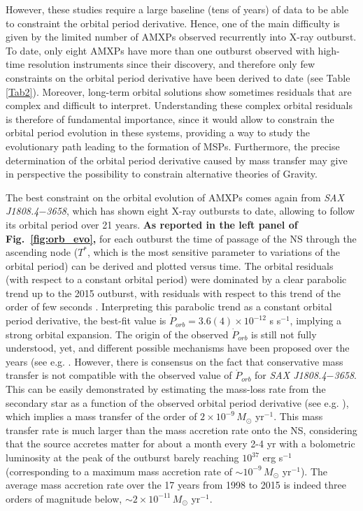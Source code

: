 \documentclass[graybox]{svmult}
\def \saxj{{\em SAX J1808.4$-$3658\xspace}}
\begin{document}
However, these studies require a large baseline (tens of years) of data to be able to constraint the orbital period derivative. Hence, one of the main difficulty is given by the limited number of AMXPs observed recurrently into X-ray outburst. To date, only eight AMXPs have more than one outburst observed with high-time resolution instruments since their discovery, and therefore only few constraints on the orbital period derivative have been derived to date (see Table \ref{Tab2}). Moreover, long-term orbital solutions show sometimes residuals that are complex and difficult to interpret. Understanding these complex orbital residuals is therefore of fundamental importance, since it would allow to constrain the orbital period evolution in these systems, providing a way to study the evolutionary path leading to the formation of MSPs. Furthermore, the precise determination of the orbital period derivative caused by mass transfer may give in perspective the possibility to constrain alternative theories of Gravity.

The best constraint on the orbital evolution of AMXPs comes again from \saxj{}, which has shown eight X-ray outbursts to date, allowing to follow its orbital period over 21 years. \textbf{As reported in the left panel of Fig.~\ref{fig:orb_evo},} for each outburst the time of passage of the NS through the ascending node ($T^*$, which is the most sensitive parameter to variations of the orbital period) can be derived and plotted versus time. The orbital residuals (with respect to a constant orbital period) were dominated by a clear parabolic trend up to the 2015 outburst, with residuals with respect to this trend of the order of few seconds \cite{Sanna2017c}. Interpreting this parabolic trend as a constant orbital period derivative, the best-fit value is $\dot P_{orb} = 3.6(4) \times 10^{-12}$ s s$^{-1}$, implying a strong orbital expansion. The origin of the observed $\dot P_{orb}$ is still not fully understood, yet, and different possible mechanisms have been proposed over the years (see e.g. \cite{DiSalvo2008,Hartman2008,Burderi2009,Patruno2012b,Patruno2016}. However, there is consensus on the fact that conservative mass transfer is not compatible with the observed value of $\dot P_{orb}$ for \saxj{}. This can be easily demonstrated by estimating the mass-loss rate from the secondary star as a function of the observed orbital period derivative (see e.g. \cite{Burderi2009}), which implies a mass transfer of the order of $2 \times 10^{-9}\, M_\odot$ yr$^{-1}$. This mass transfer rate is much larger than the mass accretion rate onto the NS, considering that the source accretes matter for about a month every 2-4 yr with a bolometric luminosity at the peak of the outburst barely reaching $10^{37}$ erg s$^{-1}$ (corresponding to a maximum mass accretion rate of $\sim 10^{-9}\, M_\odot$ yr$^{-1}$). The average mass accretion rate over the 17 years from 1998 to 2015 is indeed three orders of magnitude below, $\sim 2 \times 10^{-11}\, M_\odot$ yr$^{-1}$. 
\end{document}
